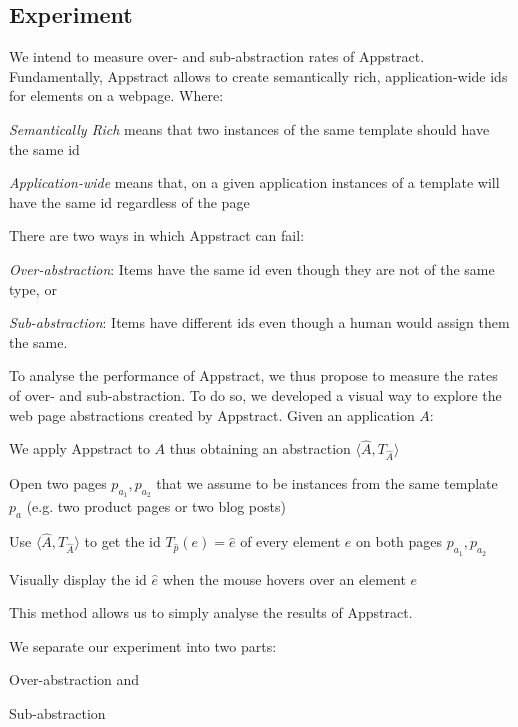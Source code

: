 \subsection{Experiment}
We intend to measure over- and sub-abstraction rates of Appstract. 
Fundamentally, Appstract allows to create semantically rich, application-wide ids for elements on a webpage.
Where:
\begin{compactitem}
  \item \textit{Semantically Rich} means that two instances of the same template should have the same id
  \item \textit{Application-wide} means that, on a given application instances of a template will have the same id regardless of the page
\end{compactitem}
There are two ways in which Appstract can fail:
\begin{compactitem}
  \item \emph{Over-abstraction}: Items have the same id even though they are not of the same type, or
  \item \emph{Sub-abstraction}: Items have different ids even though a human would assign them the same.
\end{compactitem}
To analyse the performance of Appstract, we thus propose to measure the rates of over- and sub-abstraction.
To do so, we developed a visual way to explore the web page abstractions created by Appstract.
Given an application $A$:
\begin{compactitem}
  \item We apply Appstract to $A$ thus obtaining an abstraction $\langle \hat{A}, T_{\hat{A}} \rangle$
  \item Open two pages $p_{a_1}, p_{a_2}$ that we assume to be instances from the same template $p_a$ (e.g. two product pages or two blog posts)
  \item Use $\langle \hat{A}, T_{\hat{A}} \rangle$ to get the id $T_{\hat{p}}(e) = \hat{e}$ of every element $e$ on both pages $p_{a_1}, p_{a_2}$
  \item Visually display the id $\hat{e}$ when the mouse hovers over an element $e$
\end{compactitem}
This method allows us to simply analyse the results of Appstract.

We separate our experiment into two parts:
\begin{inparaenum}
    \item Over-abstraction and
    \item Sub-abstraction
\end{inparaenum}

